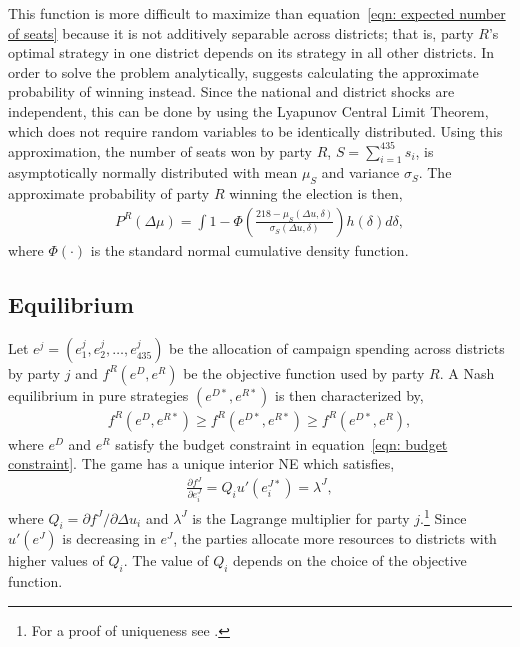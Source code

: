 \documentclass[12pt,final,fleqn]{article}
\theoremstyle{plain}
\begin{document}
This function is more difficult to maximize than equation~\ref{eqn: expected number of seats} because it is not additively separable across districts; that is, party $R$'s optimal strategy in one district depends on its strategy in all other districts. In order to solve the problem analytically, \citet{stromberg2008electoral} suggests calculating the approximate probability of winning instead. Since the national and district shocks are independent, this can be done by using the Lyapunov Central Limit Theorem, which does not require random variables to be identically distributed. Using this approximation, the number of seats won by party $R$, $S=\sum_{i=1}^{435} s_i$, is asymptotically normally distributed with mean $\mu_S$ and variance $\sigma_S$. The approximate probability of party $R$ winning the election is then,
\begin{align}
P^R(\Delta \mu) = \int 1 - \Phi\left(\frac{218 - \mu_S(\Delta u, \delta)}{\sigma_S(\Delta u, \delta)}\right) h(\delta)d\delta,
\end{align}
where $\Phi(\cdot)$ is the standard normal cumulative density function.

\subsection{Equilibrium} \label{sec: equilibrium}
Let $e^j = (e_1^j, e_2^j, \ldots, e_{435}^j)$ be the allocation of campaign spending across districts by party $j$ and $f^R(e^D, e^R)$ be the objective function used by party $R$. A Nash equilibrium in pure strategies $(e^{D*}, e^{R*})$ is then characterized by,
\begin{align}
f^R(e^D, e^{R*}) \geq f^R(e^{D*}, e^{R*}) \geq f^R(e^{D*}, e^{R}),
\end{align}
where $e^D$ and $e^R$ satisfy the budget constraint in equation~\ref{eqn: budget constraint}. The game has a unique interior NE which satisfies,
\begin{align}
\frac{\partial f^J}{\partial e_i^J}= Q_i u'(e^{J*}_i)=\lambda^J,
\end{align}
where $Q_i = \partial f^J/ \partial \Delta u_i$ and $\lambda^J$ is the Lagrange multiplier for party $j$.\footnote{For a proof of uniqueness see \citet{stromberg2008electoral}.} Since $u'(e^J)$ is decreasing in $e^J$, the parties allocate more resources to districts with higher values of $Q_i$. The value of $Q_i$ depends on the choice of the objective function.
\end{document}
